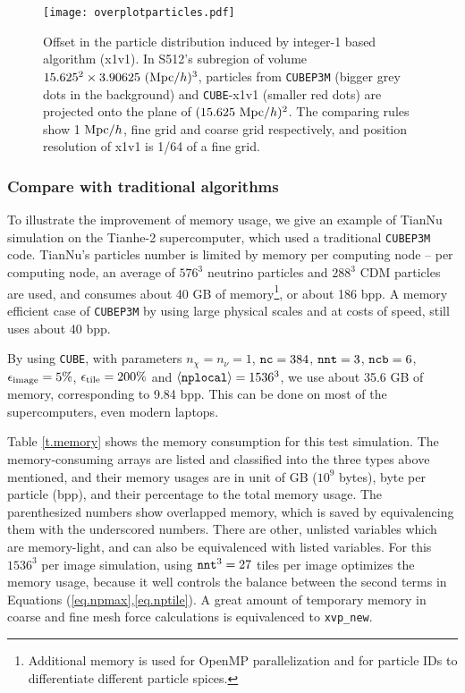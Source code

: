 \documentclass[10pt,twocolumn,preprint]{emulateapj}
\begin{document}
\begin{figure}[t]
\centering
  \texttt{[image: overplotparticles.pdf]}
 \caption{Offset in the particle distribution induced by integer-1 based algorithm (x1v1). In S512's subregion of volume $15.625^2\times 3.90625\ ({\rm Mpc}/h)^3$, particles from {\tt CUBEP3M} (bigger grey dots in the background) and {\tt CUBE}-x1v1 (smaller red dots) are projected onto the plane of $(15.625\ {\rm Mpc}/h)^2$. The comparing rules show 1 ${\rm Mpc}/h$, fine grid and coarse grid respectively, and position resolution of x1v1 is 1/64 of a fine grid.}
\label{fig.particles}
\end{figure}

\subsubsection{Compare with traditional algorithms}
To illustrate the improvement of memory usage, we give an example of TianNu simulation \citep{2017NatAs...1E.143Y} on the Tianhe-2 supercomputer, which used a traditional {\tt CUBEP3M} code. TianNu's particles number is limited by memory per computing node -- per computing node, an average of $576^3$ neutrino particles and $288^3$ CDM particles are used, and consumes about 40 GB of memory\footnote{Additional memory is used for OpenMP parallelization and for particle IDs to differentiate different particle spices.}, or about 186 bpp. A memory efficient case of {\tt CUBEP3M} by using large physical scales and at costs of speed, still uses about 40 bpp. 

By using {\tt CUBE}, with parameters $n_\chi=n_\nu=1$, ${\tt nc}=384$, ${\tt nnt}=3$, ${\tt ncb}=6$, $\epsilon_{\rm image}=5\%$, $\epsilon_{\rm tile}=200\%$ and $\left\langle {\tt nplocal} \right\rangle=1536^3$, we use about 35.6 GB of memory, corresponding to 9.84 bpp. This can be done on most of the supercomputers, even modern laptops.

Table \ref{t.memory} shows the memory consumption for this test simulation. The memory-consuming arrays are listed and classified into the three types above mentioned, and their memory usages are in unit of GB ($10^9$ bytes), byte per particle (bpp), and their percentage to the total memory usage. The parenthesized numbers show overlapped memory, which is saved by equivalencing them with the underscored numbers. There are other, unlisted variables which are memory-light, and can also be equivalenced with listed variables. For this $1536^3$ per image simulation, using ${\tt nnt}^3=27$ tiles per image optimizes the memory usage, because it well controls the balance between the second terms in Equations (\ref{eq.npmax},\ref{eq.nptile}). A great amount of temporary memory in coarse and fine mesh force calculations is equivalenced to {\tt xvp\_new}.
\end{document}
